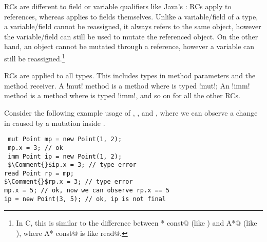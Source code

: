 RCs are different to field or variable qualifiers like Java's \Q@final@: RCs apply to references, whereas \Q@final@ applies to fields themselves. Unlike a variable/field of a \Q@read@ type, a \Q@final@ variable/field cannot be reassigned, it always refers to the same object, however the variable/field can still be used to mutate the referenced object.
On the other hand, an object cannot be mutated through a \Q@read@ reference, however a \Q@read@ variable can still be reassigned.\footnote{In C, this is similar to the difference between \Q@A* const@ (like \Q@final@) and \Q@const A*@ (like \Q@read@), where \Q@const A* const@ is like \Q@final read@.}

RCs are applied to all types. This includes types in method parameters and the method receiver.
A \Q!mut! method is a method where \Q@this@ is typed \Q!mut!;
An \Q!imm! method is a method where \Q@this@ is typed \Q!imm!, and so on for all the other RCs.


Consider the following  example usage of \Q@mut@, \Q@imm@, and \Q@read@, where we can observe a change in \Q@rp@ caused by a mutation inside \Q@mp@.
\begin{lstlisting}
 mut Point mp = new Point(1, 2);
 mp.x = 3; // ok
 imm Point ip = new Point(1, 2);
 $\Comment{}$ip.x = 3; // type error
read Point rp = mp;
$\Comment{}$rp.x = 3; // type error
mp.x = 5; // ok, now we can observe rp.x == 5
ip = new Point(3, 5); // ok, ip is not final
\end{lstlisting} 

